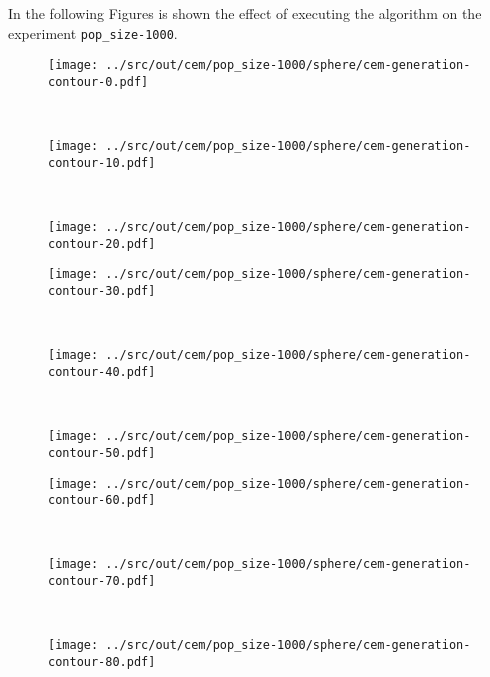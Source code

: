 In the following Figures is shown the effect of executing the algorithm on the experiment \texttt{pop\_size-1000}. 
 \begin{figure}[H]
	\begin{minipage}[b]{.3\textwidth}
		\centering
		\texttt{[image: ../src/out/cem/pop\_size-1000/sphere/cem-generation-contour-0.pdf]}	
	\end{minipage}
	~
	\begin{minipage}[b]{.3\textwidth}
		\centering
		\texttt{[image: ../src/out/cem/pop\_size-1000/sphere/cem-generation-contour-10.pdf]}	
	\end{minipage}
	~
	\begin{minipage}[b]{.3\textwidth}
		\centering
		\texttt{[image: ../src/out/cem/pop\_size-1000/sphere/cem-generation-contour-20.pdf]}	
	\end{minipage}

	\begin{minipage}[b]{.3\textwidth}
		\centering
		\texttt{[image: ../src/out/cem/pop\_size-1000/sphere/cem-generation-contour-30.pdf]}	
	\end{minipage}
	~
	\begin{minipage}[b]{.3\textwidth}
		\centering
		\texttt{[image: ../src/out/cem/pop\_size-1000/sphere/cem-generation-contour-40.pdf]}	
	\end{minipage}
	~
	\begin{minipage}[b]{.3\textwidth}
		\centering
		\texttt{[image: ../src/out/cem/pop\_size-1000/sphere/cem-generation-contour-50.pdf]}	
	\end{minipage}
	
		\begin{minipage}[b]{.3\textwidth}
		\centering
		\texttt{[image: ../src/out/cem/pop\_size-1000/sphere/cem-generation-contour-60.pdf]}	
	\end{minipage}
	~
	\begin{minipage}[b]{.3\textwidth}
		\centering
		\texttt{[image: ../src/out/cem/pop\_size-1000/sphere/cem-generation-contour-70.pdf]}	
	\end{minipage}
	~
	\begin{minipage}[b]{.3\textwidth}
		\centering
		\texttt{[image: ../src/out/cem/pop\_size-1000/sphere/cem-generation-contour-80.pdf]}	
	\end{minipage}
	
\end{figure}


